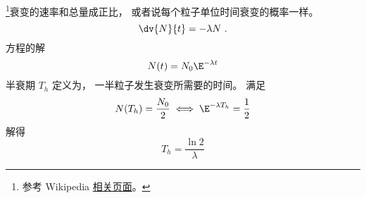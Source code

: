 
\begin{issues}
\issueDraft
\end{issues}



\footnote{参考 Wikipedia \href{https://en.wikipedia.org/wiki/Exponential_decay}{相关页面}。}衰变的速率和总量成正比， 或者说每个粒子单位时间衰变的概率一样。
\begin{equation}
\dv{N}{t} = -\lambda N~.
\end{equation}
方程的解
\begin{equation}
N(t) = N_0 \E^{-\lambda t}
\end{equation}
半衰期 $T_h$ 定义为， 一半粒子发生衰变所需要的时间。 满足
\begin{equation}
N(T_h) = \frac{N_0}{2} \iff \E^{-\lambda T_h} = \frac{1}{2}
\end{equation}
解得
\begin{equation}
T_h = \frac{\ln 2}{\lambda}
\end{equation}
